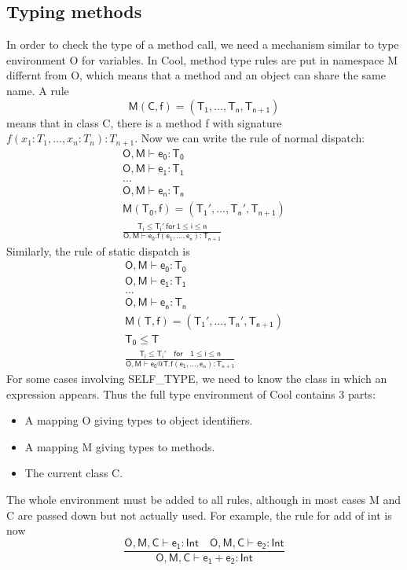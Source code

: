 \subsection{Typing methods}
In order to check the type of a method call, we need a mechanism similar to type environment O for variables. In Cool, method type rules are put in namespace M differnt from O, which means that a method and an object can share the same name. A rule 
\begin{equation*}
\mathsf{M(C,f) = (T_1,\dots,T_n,T_{n+1})}
\end{equation*}
means that in class C, there is a method f with signature $f(x_1:T_1,\dots,x_n:T_n):T_{n+1}$. Now we can write the rule of normal dispatch:
\begin{gather*}
\mathsf{O,M\vdash e_0:T_0}\\
\mathsf{O,M\vdash e_1:T_1}\\
\dots\\
\mathsf{O,M\vdash e_n:T_n}\\
\mathsf{M(T_0,f) = (T_1',\dots,T_n', T_{n+1})}\\
\mathsf{\frac{T_i\leq T_i'\:for\:1\leq i \leq n}{O,M\vdash e_0.f(e_1,\dots,e_n):T_{n+1}}}
\end{gather*}
Similarly, the rule of static dispatch is 
\begin{gather*}
\mathsf{O,M\vdash e_0:T_0}\\
\mathsf{O,M\vdash e_1:T_1}\\
\dots\\
\mathsf{O,M\vdash e_n:T_n}\\
\mathsf{M(T,f) = (T_1',\dots,T_n',T_{n+1})}\\
\mathsf{T_0\leq T}\\
\mathsf{\frac{T_i\leq T_i'\quad for\quad1\leq i \leq n}{O,M\vdash e_0@T.f(e_1,\dots,e_n): T_{n+1}}}
\end{gather*}
For some cases involving \textsf{SELF\_TYPE}, we need to know the class in which an expression appears. Thus the full type environment of Cool contains 3 parts:
\begin{itemize}
\item A mapping O giving types to object identifiers.
\item A mapping M giving types to methods.
\item The current class C.
\end{itemize}
The whole environment must be added to all rules, although in most cases M and C are passed down but not actually used. For example, the rule for add of int is now
\begin{equation}\label{intaddrule}
\mathsf{\frac{O,M,C\vdash e_1:Int\quad O,M,C\vdash e_2:Int}{O,M,C\vdash e_1+e_2:Int}}
\end{equation}
